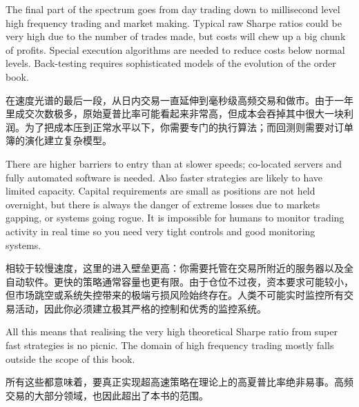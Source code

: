 \begin{englishblock} The final part of the spectrum goes from day trading down to millisecond level high frequency trading and market making. Typical raw Sharpe ratios could be very high due to the number of trades made, but costs will chew up a big chunk of profits. Special execution algorithms are needed to reduce costs below normal levels. Back-testing requires sophisticated models of the evolution of the order book. \end{englishblock}

\begin{chineseblock}在速度光谱的最后一段，从日内交易一直延伸到毫秒级高频交易和做市。由于一年里成交次数极多，原始夏普比率可能看起来非常高，但成本会吞掉其中很大一块利润。为了把成本压到正常水平以下，你需要专门的执行算法；而回测则需要对订单簿的演化建立复杂模型。\end{chineseblock}

\bipairgap

\begin{englishblock} There are higher barriers to entry than at slower speeds; co-located servers and fully automated software is needed. Also faster strategies are likely to have limited capacity. Capital requirements are small as positions are not held overnight, but there is always the danger of extreme losses due to markets gapping, or systems going rogue. It is impossible for humans to monitor trading activity in real time so you need very tight controls and good monitoring systems. \end{englishblock}

\begin{chineseblock}相较于较慢速度，这里的进入壁垒更高：你需要托管在交易所附近的服务器以及全自动软件。更快的策略通常容量也更有限。由于仓位不过夜，资本要求可能较小，但市场跳空或系统失控带来的极端亏损风险始终存在。人类不可能实时监控所有交易活动，因此你必须建立极其严格的控制和优秀的监控系统。\end{chineseblock}

\bipairgap

\begin{englishblock} All this means that realising the very high theoretical Sharpe ratio from super fast strategies is no picnic. The domain of high frequency trading mostly falls outside the scope of this book. \end{englishblock}

\begin{chineseblock}所有这些都意味着，要真正实现超高速策略在理论上的高夏普比率绝非易事。高频交易的大部分领域，也因此超出了本书的范围。\end{chineseblock}

